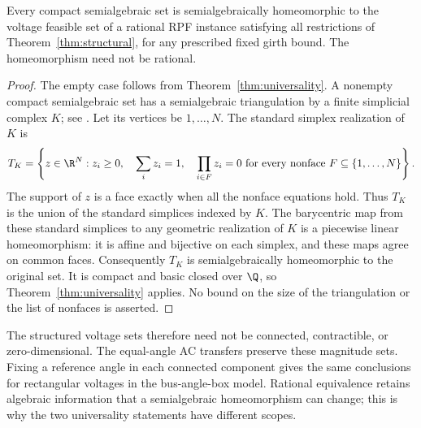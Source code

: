 \begin{theorem}
\label{thm:topological-universality}
Every compact semialgebraic set is semialgebraically homeomorphic to the
voltage feasible set of a rational RPF instance satisfying all restrictions
of Theorem~\ref{thm:structural}, for any prescribed fixed girth bound.
The homeomorphism need not be rational.
\end{theorem}
\begin{proof}
The empty case follows from Theorem~\ref{thm:universality}. A nonempty
compact semialgebraic set has a semialgebraic triangulation by a finite
simplicial complex $K$; see \citet[Theorem 1.1 and Section 1.2]{OhmotoShiota2017}.
Let its vertices be $1,\ldots,N$. The standard simplex realization of $K$ is
\begin{equation}
\label{eq:simplex-nonfaces}
 T_K=\left\{z\in\R^N:
 z_i\ge0,\quad \sum_i z_i=1,\quad
 \prod_{i\in F}z_i=0\ \text{for every nonface }F\subseteq\{1,\ldots,N\}
 \right\}.
\end{equation}
The support of $z$ is a face exactly when all the nonface equations hold.
Thus $T_K$ is the union of the standard simplices indexed by $K$.
The barycentric map from these standard simplices to any geometric
realization of $K$ is a piecewise linear homeomorphism: it is affine and
bijective on each simplex, and these maps agree on common faces.
Consequently $T_K$ is semialgebraically homeomorphic to the original set.
It is compact and basic closed over $\Q$, so
Theorem~\ref{thm:universality} applies. No bound on the size of the
triangulation or the list of nonfaces is asserted.
\end{proof}

The structured voltage sets therefore need not be connected, contractible,
or zero-dimensional. The equal-angle AC transfers preserve these magnitude
sets. Fixing a reference angle in each connected component gives the same
conclusions for rectangular voltages in the bus-angle-box model. Rational
equivalence retains algebraic information that a semialgebraic
homeomorphism can change; this is why the two universality statements
have different scopes.

